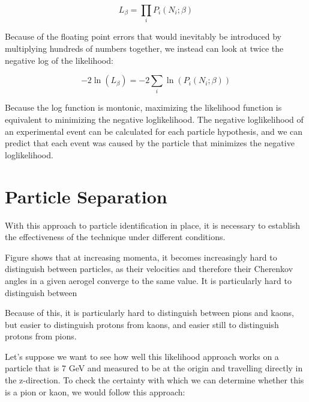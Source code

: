 $$L_\beta = \prod_{i}P_i(N_i; \beta)$$

Because of the floating point errors that would inevitably be introduced by multiplying hundreds of numbers together, we instead can look at twice the negative log of the likelihood:

\begin{equation}
    \label{eq:loglikelihood}
    -2\ln(L_\beta) = -2\sum_i \ln(P_i(N_i; \beta))
\end{equation}

Because the log function is montonic, maximizing the likelihood function is equivalent to minimizing the negative loglikelihood.
The negative loglikelihood of an experimental event can be calculated for each particle hypothesis, and we can predict that each event was caused by the particle that minimizes the negative loglikelihood.

\section{Particle Separation}
With this approach to particle identification in place, it is necessary to establish the effectiveness of the technique under different conditions.

Figure  shows that at increasing momenta, it becomes increasingly hard to distinguish between particles, as their velocities and therefore their Cherenkov angles in a given aerogel converge to the same value.
It is particularly hard to distinguish between 

Because of this, it is particularly hard to distinguish between pions and kaons, but easier to distinguish protons from kaons, and easier still to distinguish protons from pions.

Let's suppose we want to see how well this likelihood approach works on a particle that is 7 GeV and measured to be at the origin and travelling directly in the z-direction.
To check the certainty with which we can determine whether this is a pion or kaon, we would follow this approach:

